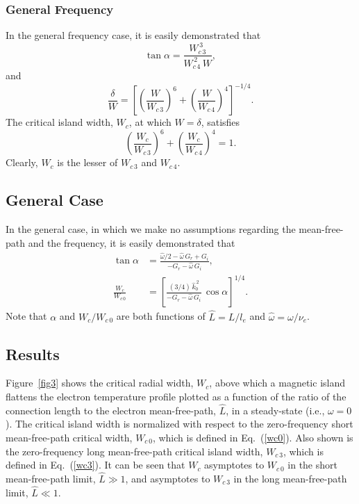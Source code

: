 \documentclass[12pt,prb,aps]{revtex4-1}
\begin{document}
\subsubsection{General Frequency}
In the general frequency case, it is easily demonstrated that
\begin{equation}
\tan\alpha  = \frac{W_{c\,3}^{\,3}}{W_{c\,4}^{\,2}\,W},
\end{equation}
and
\begin{equation}
\frac{\delta}{W} = \left[\left(\frac{W}{W_{c\,3}}\right)^6+\left(\frac{W}{W_{c\,4}}\right)^4 \right]^{-1/4}.
\end{equation}
The critical island width, $W_c$,  at which $W=\delta$, satisfies
\begin{equation}
\left(\frac{W_c}{W_{c\,3}}\right)^6+\left(\frac{W_c}{W_{c\,4}}\right)^4  = 1.
\end{equation}
Clearly, $W_c$ is the lesser of $W_{c\,3}$ and $W_{c\,4}$. 

\subsection{General Case}
In the general case, in which we make no assumptions regarding the mean-free-path and the frequency, it is easily demonstrated that
\begin{align}
\tan\alpha& = \frac{\hat{\omega}/2 -\hat{\omega}\,G_r + G_i}{-G_r-\hat{\omega}\,G_i},\\[0.5ex]
\frac{W_c}{W_{c\,0}} &= \left[\frac{(3/4)\,\hat{k}_0^{\,2}}{-G_r-\hat{\omega}\,G_i}\,\cos\alpha\right]^{1/4}.\label{e149}
\end{align}
Note that $\alpha$ and $W_c/W_{c\,0}$ are both functions of $\hat{L}=L/l_e$ and $\hat{\omega}=\omega/\nu_e$. 

\subsection{Results}
Figure~\ref{fig3} shows the critical radial width, $W_c$,  above which a magnetic island flattens the electron temperature profile plotted
as a function of the ratio of the connection length to the electron mean-free-path, $\hat{L}$,  in a steady-state (i.e., $\omega=0$). The critical
island width is normalized with respect to the zero-frequency short mean-free-path critical width, $W_{c\,0}$, which is defined in
Eq.~(\ref{wc0}). Also shown is the zero-frequency long mean-free-path critical island width, $W_{c\,3}$, which is defined in Eq.~(\ref{wc3}). 
It can be seen that $W_c$ asymptotes to $W_{c\,0}$ in the short mean-free-path limit, $\hat{L}\gg 1$, and asymptotes to $W_{c\,3}$ in
the long mean-free-path limit, $\hat{L}\ll 1$.
\end{document}
